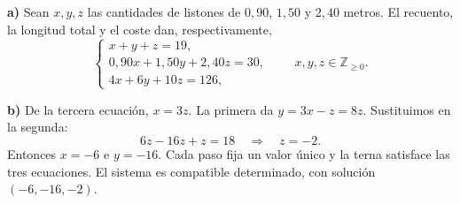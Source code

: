 \textbf{a)} Sean $x,y,z$ las cantidades de listones de $0{,}90$, $1{,}50$ y $2{,}40$ metros. El recuento, la longitud total y el coste dan, respectivamente,
\[
\begin{cases}
x+y+z=19,\\
0{,}90x+1{,}50y+2{,}40z=30,\\
4x+6y+10z=126,
\end{cases}
\qquad x,y,z\in\mathbb Z_{\ge0}.
\]

\textbf{b)} De la tercera ecuación, $x=3z$. La primera da $y=3x-z=8z$. Sustituimos en la segunda:
\[
6z-16z+z=18\quad\Longrightarrow\quad z=-2.
\]
Entonces $x=-6$ e $y=-16$. Cada paso fija un valor único y la terna satisface las tres ecuaciones. El sistema es compatible determinado, con solución $\boxed{(-6,-16,-2)}$.
